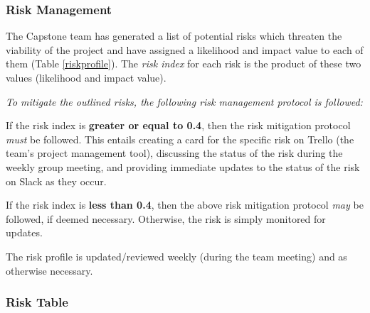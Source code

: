 \subsubsection{Risk Management}
The Capstone team has generated a list of potential risks which threaten the viability of the project and have assigned a likelihood and impact value to each of them (Table \ref{riskprofile}). The \textit{risk index} for each risk is the product of these two values (likelihood and impact value). 

\textit{To mitigate the outlined risks, the following risk management protocol is followed:}


If the risk index is \textbf{greater or equal to 0.4}, then the risk mitigation protocol \textit{must} be followed. This entails creating a card for the specific risk on Trello (the team's project management tool), discussing the status of the risk during the weekly group meeting, and providing immediate updates to the status of the risk on Slack as they occur.

If the risk index is \textbf{less than 0.4}, then the above risk mitigation protocol \textit{may} be followed, if deemed necessary. Otherwise, the risk is simply monitored for updates.

The risk profile is updated/reviewed weekly (during the team meeting) and as otherwise necessary. 


\subsubsection{Risk Table}

